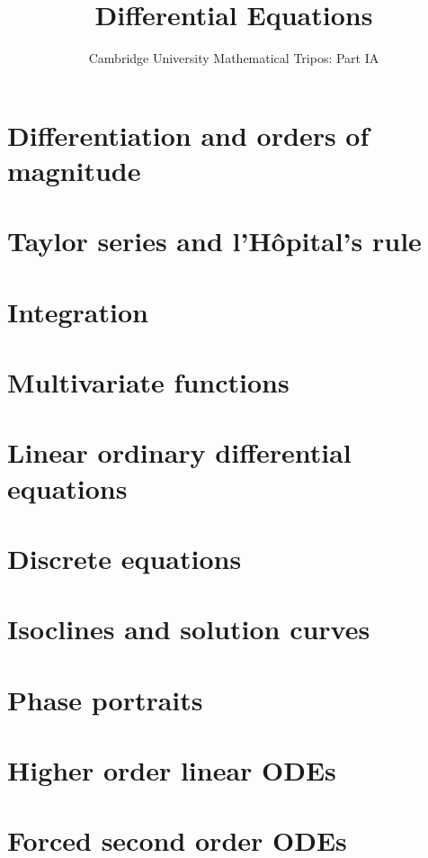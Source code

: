 \documentclass{article}
\title{Differential Equations}
\author{Cambridge University Mathematical Tripos: Part IA}
\begin{document}
\maketitle

\tableofcontentsnewpage{}

\section{Differentiation and orders of magnitude}

\section{Taylor series and l'H\^opital's rule}

\section{Integration}

\section{Multivariate functions}

\section{Linear ordinary differential equations}

\section{Discrete equations}

\section{Isoclines and solution curves}

\section{Phase portraits}

\section{Higher order linear ODEs}

\section{Forced second order ODEs}

\end{document}
